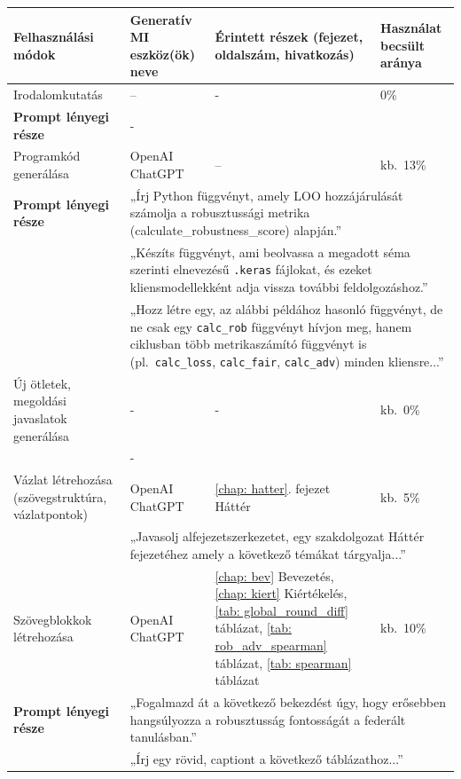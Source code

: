 \begin{table}[H]
\scriptsize
\setlength{\tabcolsep}{2pt}
\renewcommand{\arraystretch}{1.1}
\noindent
\begin{tabular}{|p{2.7cm}|p{2.6cm}|p{7.4cm}|p{1.5cm}|}\hline
\textbf{Felhasználási módok} 
  & \textbf{Generatív MI eszköz(ök) neve} 
  & \textbf{Érintett részek (fejezet, oldalszám, hivatkozás)} 
  & \textbf{Használat becsült aránya} \\ \hline\hline

Irodalomkutatás 
  & -- 
  & - 
  & 0\% \\ \hline
\textbf{Prompt lényegi része}  
  & \multicolumn{3}{|p{11.5cm}|}{-} \\ \hline\hline

Programkód generálása 
  & \makecell{OpenAI\\ChatGPT}
  & -- 
  & kb.\ 13\% \\ \hline
\textbf{Prompt lényegi része } 
  & \multicolumn{3}{|p{11.5cm}|}{„Írj Python függvényt, amely  LOO hozzájárulását számolja a robusztussági metrika (calculate\_robustness\_score) alapján.”}\\[2pt]
  & \multicolumn{3}{|p{11.5cm}|}{
  „Készíts függvényt, ami beolvassa a megadott séma szerinti elnevezésű \texttt{.keras} fájlokat, és ezeket kliensmodellekként adja vissza további feldolgozáshoz.”}\\[2pt] 
  & \multicolumn{3}{|p{11.5cm}|}{
  „Hozz létre egy, az alábbi példához hasonló függvényt, de ne csak egy \texttt{calc\_rob} függvényt hívjon meg, hanem ciklusban több metrikaszámító függvényt is (pl.\ \texttt{calc\_loss}, \texttt{calc\_fair}, \texttt{calc\_adv}) minden kliensre...”} \\ \hline\hline

Új ötletek, megoldási javaslatok generálása 
  & -
  & -
  & kb.\ 0\% \\ \hline 
  & \multicolumn{3}{|p{11.5cm}|}{-} \\ \hline\hline

Vázlat létrehozása (szövegstruktúra, vázlatpontok) 
  & \makecell{OpenAI\\ChatGPT}
  & \ref{chap: hatter}. fejezet Háttér  
  & kb.\ 5\% \\ \hline 
  & \multicolumn{3}{|p{11.5cm}|}{„Javasolj alfejezetszerkezetet, egy szakdolgozat Háttér fejezetéhez amely a következő témákat tárgyalja...”} \\ \hline


Szövegblokkok létrehozása 
  & \makecell{OpenAI\\ChatGPT}
  & \ref{chap: bev} Bevezetés, \ref{chap: kiert} Kiértékelés, \ref{tab: global_round_diff} táblázat, \ref{tab: rob_adv_spearman} táblázat, \ref{tab: spearman} táblázat
  & kb.\ 10\% \\ \hline
\textbf{Prompt lényegi része}  
  & \multicolumn{3}{|p{11.5cm}|}{„Fogalmazd át a következő bekezdést úgy, hogy erősebben hangsúlyozza a robusztusság fontosságát a federált tanulásban.”}\\[2pt]
  & \multicolumn{3}{|p{11.5cm}|}{
  „Írj egy rövid, captiont a következő táblázathoz...”} \\ \hline\hline


\end{tabular}
\end{table}

